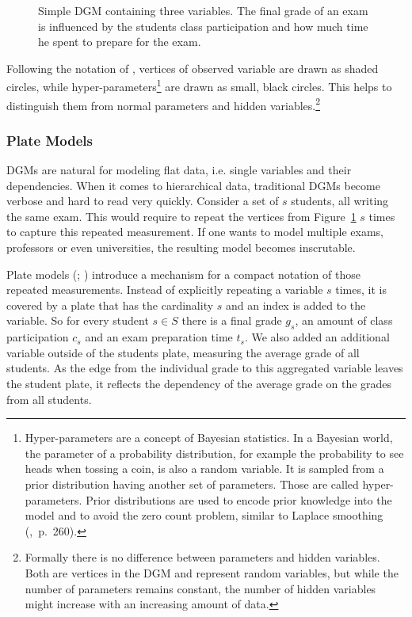 \begin{figure}[t]
	\begin{center}
    	\scalebox{\tikzScale}{\adjustTikzSize }
	\end{center}
\caption[Simple directed graphical model containing three variables.]{Simple DGM containing three variables. The final grade of an exam is influenced by the students class participation and how much time he spent to prepare for the exam.}
		\label{fig:simple_dgm}
\end{figure}

Following the notation of \textcite{bishop2006pattern}, vertices of observed variable are drawn as shaded circles, while hyper-parameters\footnote{Hyper-parameters are a concept of Bayesian statistics. In a Bayesian world, the parameter of a probability distribution, for example the probability to see heads when tossing a coin, is also a random variable. It is sampled from a prior distribution having another set of parameters. Those are called hyper-parameters. Prior distributions are used to encode prior knowledge into the model and to avoid the zero count problem, similar to Laplace smoothing (\cite{manning2008introduction},~p.~260).} are drawn as small, black circles. This helps to distinguish them from normal parameters and hidden variables.\footnote{Formally there is no difference between parameters and hidden variables. Both are vertices in the DGM and represent random variables, but while the number of parameters remains constant, the number of hidden variables might increase with an increasing amount of data.}

\subsubsection{Plate Models}

DGMs are natural for modeling flat data, i.e. single variables and their dependencies. When it comes to hierarchical data, traditional DGMs become verbose and hard to read very quickly. Consider a set of $s$ students, all writing the same exam. This would require to repeat the vertices from Figure~\ref{fig:simple_dgm} $s$ times to capture this repeated measurement. If one wants to model multiple exams, professors or even universities, the resulting model becomes inscrutable.

Plate models (\cite{buntine1994operations}; \cite{gilks1994language}) introduce a mechanism for a compact notation of those repeated measurements. Instead of explicitly repeating a variable $s$ times, it is covered by a plate that has the cardinality $s$ and an index is added to the variable. So for every student $s \in S$ there is a final grade $g_s$, an amount of class participation $c_s$ and an exam preparation time $t_s$. We also added an additional variable outside of the students plate, measuring the average grade of all students. As the edge from the individual grade to this aggregated variable leaves the student plate, it reflects the dependency of the average grade on the grades from all students.

